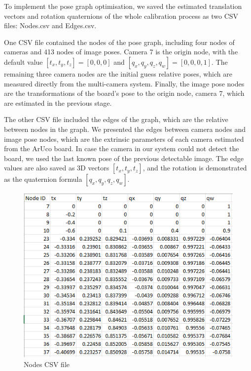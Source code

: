 To implement the pose graph optimisation, we saved the estimated translation vectors and rotation quaternions of the whole calibration process as two CSV files: Nodes.csv and Edges.csv. 

One CSV file contained the nodes of the pose graph, including four nodes of cameras and 413 nodes of image poses. Camera 7 is the origin node, with the default value $[t_{x}, t_{y}, t_{z}] = [0, 0, 0]$ and $[q_{x}, q_{y}, q_{z}, q_{w}] = [0, 0, 0, 1]$. The remaining three camera nodes are the initial guess relative poses, which are measured directly from the multi-camera system. Finally, the image pose nodes are the transformations of the board's pose to the origin node, camera 7, which are estimated in the previous stage.

The other CSV file included the edges of the graph, which are the relative between nodes in the graph. We presented the edges between camera nodes and image pose nodes, which are the extrinsic parameters of each camera estimated from the ArUco board. In case the camera in our system could not detect the board, we used the last known pose of the previous detectable image. The edge values are also saved as 3D vectors $[t_{x}, t_{y}, t_{z}]$, and the rotation is demonstrated as the quaternion formula $[q_{x}, q_{y}, q_{z}, q_{w}]$.

\clearpage
\begin{figure}[ht]
\centering
\includegraphics[width=1\textwidth]{Images/CSV Nodes.png}
\caption{Nodes CSV file}
\end{figure}

